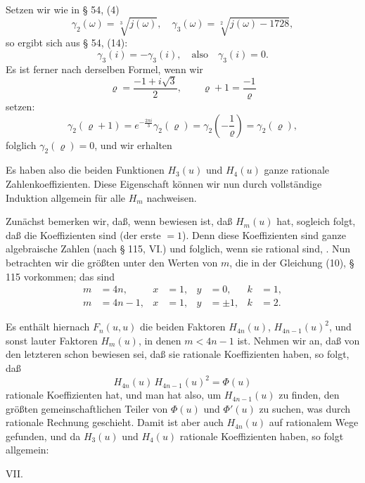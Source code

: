 Setzen wir wie in § 54, (4)
\[
\gamma_2(\omega) = \sqrt[3]{j(\omega)}, \quad \gamma_3(\omega) = \sqrt[2]{j(\omega)-1728},
\]
so ergibt sich aus § 54, (14):
\[
\gamma_3(i) = -\gamma_3(i), \quad \text{also} \quad \gamma_3(i) = 0.
\]
Es ist ferner nach derselben Formel, wenn wir
\[
\varrho = \frac{-1+i\sqrt{3}}{2}, \qquad \varrho+1 = \frac{-1}{\varrho}
\]
setzen:
\[
\gamma_2(\varrho+1) = e^{-\frac{2\pi i}{3}}\gamma_2(\varrho) = \gamma_2\left(-\frac{1}{\varrho}\right) = \gamma_2(\varrho),
\]
folglich $\gamma_2(\varrho) = 0$, und wir erhalten

Es haben also die beiden Funktionen $H_3(u)$ und $H_4(u)$ ganze rationale Zahlenkoeffizienten. Diese Eigenschaft können wir nun durch vollständige Induktion allgemein für alle $H_m$ nachweisen.

Zunächst bemerken wir, daß, wenn bewiesen ist, daß $H_m(u)$  hat, sogleich folgt, daß die Koeffizienten  sind (der erste $=1$). Denn diese Koeffizienten sind ganze algebraische Zahlen (nach § 115, VI.) und folglich, wenn sie rational sind, . Nun betrachten wir die größten unter den Werten von $m$, die in der Gleichung (10), § 115 vorkommen; das sind
\[
\begin{aligned}
m &= 4n, & x &= 1, & y &= 0, & k &= 1, \\
m &= 4n-1, & x &= 1, & y &= \pm 1, & k &= 2.
\end{aligned}
\]

Es enthält hiernach $F_n(u,u)$ die beiden Faktoren $H_{4n}(u)$, $H_{4n-1}(u)^2$, und sonst lauter Faktoren $H_m(u)$, in denen $m<4n-1$ ist. Nehmen wir an, daß von den letzteren schon bewiesen sei, daß sie rationale Koeffizienten haben, so folgt, daß
\[
H_{4n}(u)\, H_{4n-1}(u)^2 = \varPhi(u)
\]
rationale Koeffizienten hat, und man hat also, um $H_{4n-1}(u)$ zu finden, den größten gemeinschaftlichen Teiler von $\varPhi(u)$ und $\varPhi'(u)$ zu suchen, was durch rationale Rechnung geschieht. Damit ist aber auch $H_{4n}(u)$ auf rationalem Wege gefunden, und da $H_3(u)$ und $H_4(u)$ rationale Koeffizienten haben, so folgt allgemein:

VII. 
